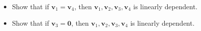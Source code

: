\documentclass[12pt]{article}
\begin{document}
\begin{enumerate}[1.]
  \begin{itemize}
  \item   Show that if \(\mathbf{v}_1 = \mathbf{v}_4\), then \(\mathbf{v}_1,\mathbf{v}_2,\mathbf{v}_3,\mathbf{v}_4\) is linearly dependent.
    \vfill
  \item Show that if \(\mathbf{v}_3 = \mathbf{0}\)\),  then \(\mathbf{v}_1,\mathbf{v}_2,\mathbf{v}_3,\mathbf{v}_4\) is linearly dependent.
    \vfill
  \end{itemize}
\eject\end{enumerate} 
\end{document}
